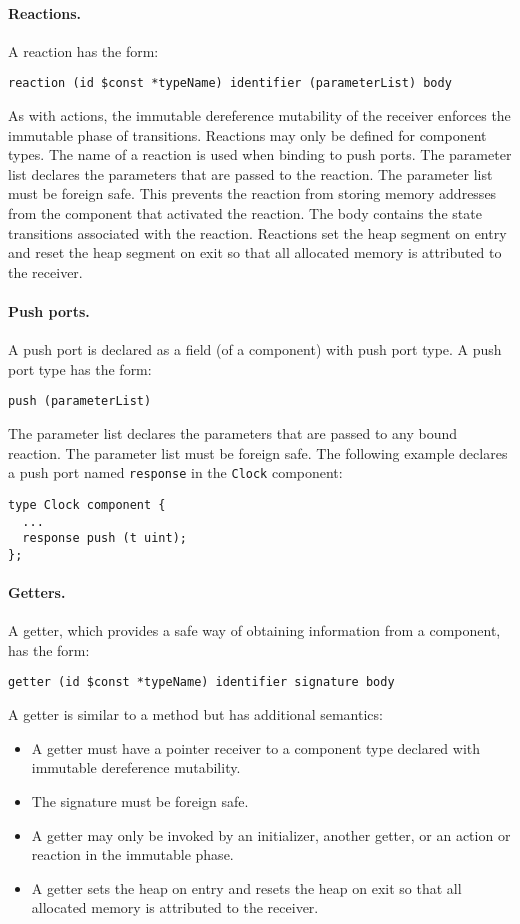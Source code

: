\paragraph{Reactions.}
A reaction has the form:
\begin{verbatim}
reaction (id $const *typeName) identifier (parameterList) body
\end{verbatim}
As with actions, the immutable dereference mutability of the receiver enforces the immutable phase of transitions.
Reactions may only be defined for component types.
The name of a reaction is used when binding to push ports.
The parameter list declares the parameters that are passed to the reaction.
The parameter list must be foreign safe.
This prevents the reaction from storing memory addresses from the component that activated the reaction.
The body contains the state transitions associated with the reaction.
Reactions set the heap segment on entry and reset the heap segment on exit so that all allocated memory is attributed to the receiver.

\paragraph{Push ports.}
A push port is declared as a field (of a component) with push port type.
A push port type has the form:
\begin{verbatim}
push (parameterList)
\end{verbatim}
The parameter list declares the parameters that are passed to any bound reaction.
The parameter list must be foreign safe.
The following example declares a push port named \verb+response+ in the \verb+Clock+ component:
\begin{verbatim}
type Clock component {
  ...
  response push (t uint);
};
\end{verbatim}

\paragraph{Getters.}
A getter, which provides a safe way of obtaining information from a component, has the form:
\begin{verbatim}
getter (id $const *typeName) identifier signature body
\end{verbatim}
A getter is similar to a method but has additional semantics:
\begin{itemize}
\item A getter must have a pointer receiver to a component type declared with immutable dereference mutability.
\item The signature must be foreign safe.
\item A getter may only be invoked by an initializer, another getter, or an action or reaction in the immutable phase.
\item A getter sets the heap on entry and resets the heap on exit so that all allocated memory is attributed to the receiver.
\end{itemize}

